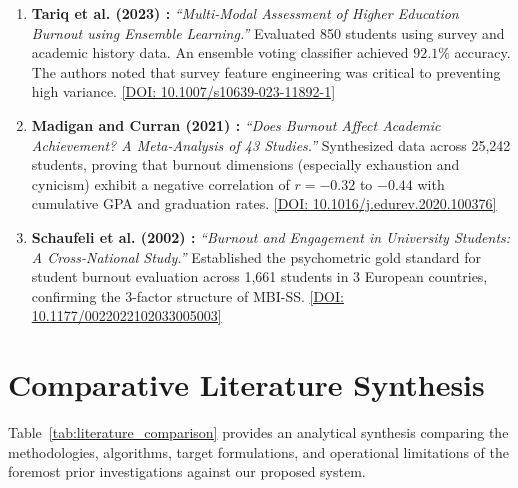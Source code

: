 \documentclass[12pt,a4paper,oneside]{report}
\begin{document}
\begin{enumerate}
    \item \textbf{Tariq et al. (2023) \cite{tariq2023}:} \emph{``Multi-Modal Assessment of Higher Education Burnout using Ensemble Learning.''} Evaluated 850 students using survey and academic history data. An ensemble voting classifier achieved $92.1\%$ accuracy. The authors noted that survey feature engineering was critical to preventing high variance. \href{https://doi.org/10.1007/s10639-023-11892-1}{[DOI: 10.1007/s10639-023-11892-1]}

    \item \textbf{Madigan and Curran (2021) \cite{madigan2021}:} \emph{``Does Burnout Affect Academic Achievement? A Meta-Analysis of 43 Studies.''} Synthesized data across 25,242 students, proving that burnout dimensions (especially exhaustion and cynicism) exhibit a negative correlation of $r = -0.32$ to $-0.44$ with cumulative GPA and graduation rates. \href{https://doi.org/10.1016/j.edurev.2020.100376}{[DOI: 10.1016/j.edurev.2020.100376]}

    \item \textbf{Schaufeli et al. (2002) \cite{schaufeli2002}:} \emph{``Burnout and Engagement in University Students: A Cross-National Study.''} Established the psychometric gold standard for student burnout evaluation across 1,661 students in 3 European countries, confirming the 3-factor structure of MBI-SS. \href{https://doi.org/10.1177/0022022102033005003}{[DOI: 10.1177/0022022102033005003]}
\end{enumerate}

\section{Comparative Literature Synthesis}
\label{sec:literature_comparison}
Table~\ref{tab:literature_comparison} provides an analytical synthesis comparing the methodologies, algorithms, target formulations, and operational limitations of the foremost prior investigations against our proposed system.
\end{document}
